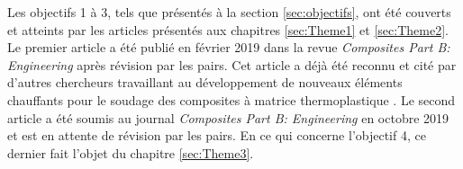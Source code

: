 Les objectifs 1 à 3, tels que présentés à la section \ref{sec:objectifs}, ont été couverts et atteints par les articles présentés aux chapitres \ref{sec:Theme1} et \ref{sec:Theme2}. 
Le premier article \cite{Brassard2019a} a été publié en février 2019 dans la revue \textit{Composites Part B: Engineering} après révision par les pairs. 
Cet article a déjà été reconnu et cité par d'autres chercheurs travaillant au développement de nouveaux éléments chauffants pour le soudage des composites à matrice thermoplastique \cite{Russello2019}. 
Le second article a été soumis au journal \textit{Composites Part B: Engineering} en octobre 2019 et est en attente de révision par les pairs. 
En ce qui concerne l'objectif 4, ce dernier fait l'objet du chapitre \ref{sec:Theme3}. 